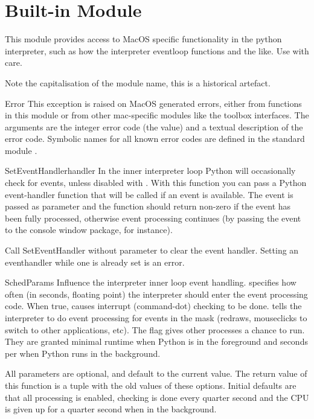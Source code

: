 \section{Built-in Module }
\label{module-MacOS}

\renewcommand{\indexsubitem}{(in module MacOS)}

This module provides access to MacOS specific functionality in the
python interpreter, such as how the interpreter eventloop functions
and the like. Use with care.

Note the capitalisation of the module name, this is a historical
artefact.

\begin{excdesc}{Error}
This exception is raised on MacOS generated errors, either from
functions in this module or from other mac-specific modules like the
toolbox interfaces. The arguments are the integer error code (the
 value) and a textual description of the error code.
Symbolic names for all known error codes are defined in the standard
module .
\end{excdesc}

\begin{funcdesc}{SetEventHandler}{handler}
In the inner interpreter loop Python will occasionally check for events,
unless disabled with . With this function you
can pass a Python event-handler function that will be called if an event
is available. The event is passed as parameter and the function should return
non-zero if the event has been fully processed, otherwise event processing
continues (by passing the event to the console window package, for instance).

Call SetEventHandler without parameter to clear the event handler. Setting
an eventhandler while one is already set is an error.
\end{funcdesc}

\begin{funcdesc}{SchedParams}{}
Influence the interpreter inner loop event handling. 
specifies how often (in seconds, floating point) the interpreter
should enter the event processing code. When true,  causes
interrupt (command-dot) checking to be done.  tells the
interpreter to do event processing for events in the mask (redraws,
mouseclicks to switch to other applications, etc). The 
flag gives other processes a chance to run. They are granted minimal
runtime when Python is in the foreground and  seconds per
 when Python runs in the background.

All parameters are optional, and default to the current value. The return
value of this function is a tuple with the old values of these options.
Initial defaults are that all processing is enabled, checking is done every
quarter second and the CPU is given up for a quarter second when in the
background.
\end{funcdesc}

